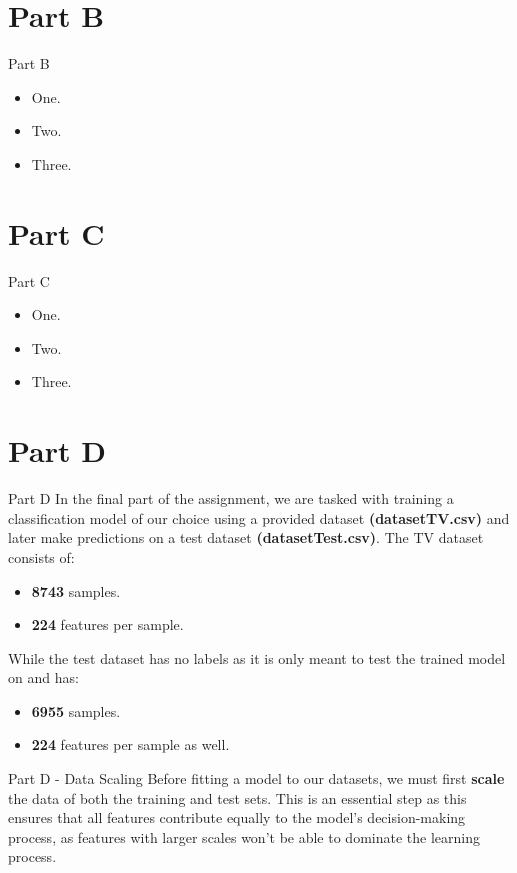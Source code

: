 \documentclass{beamer}
\begin{document}
\section{Part B}
    \begin{frame}{Part B}
        \begin{itemize}
            \item One.
            \item Two.
            \item Three.
        \end{itemize}
    \end{frame}

\section{Part C}
    \begin{frame}{Part C}
        \begin{itemize}
            \item One.
            \item Two.
            \item Three.
        \end{itemize}
    \end{frame}

\section{Part D}
    \begin{frame}{Part D}
    In the final part of the assignment, we are tasked with training a classification model of our choice using a provided
    dataset  \textbf{(datasetTV.csv)} and later make predictions on a test dataset \textbf{(datasetTest.csv)}. The TV dataset
    consists of:
    \begin{itemize}
        \item \textbf{8743} samples.
        \item \textbf{224} features per sample.
    \end{itemize}
    While the test dataset has no labels as it is only meant to test the trained model on and has:
    \begin{itemize}
        \item \textbf{6955} samples.
        \item \textbf{224} features per sample as well.
    \end{itemize}
    \end{frame}

    \begin{frame}{Part D - Data Scaling}
    Before fitting a model to our datasets, we must first \textbf{scale} the data of both the training and test sets.
    This is an essential step as this ensures that all features contribute equally to the model's decision-making process,
    as features with larger scales won't be able to dominate the learning process.
    \end{frame}
\end{document}
